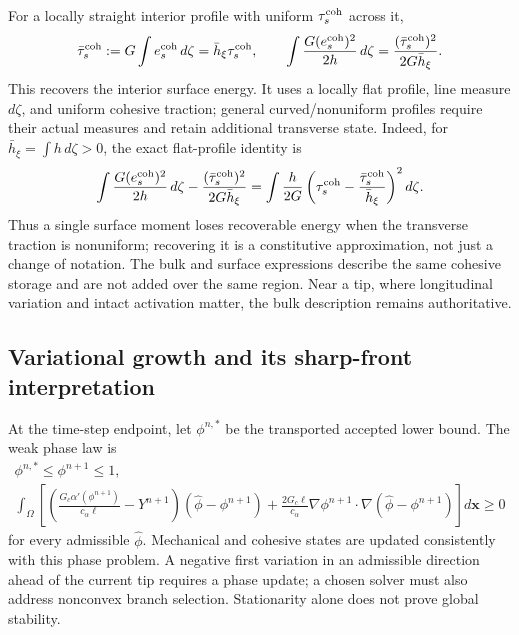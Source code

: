 \documentclass[10pt,a4paper]{article}
\begin{document}
For a locally straight interior profile with uniform
$\tau_s^{\rm coh}$ across it,
\begin{equation}
 \bar\tau_s^{\rm coh}:=G\int e_s^{\rm coh}\,d\zeta
       =\bar h_\xi\tau_s^{\rm coh},
 \qquad
 \int\frac{G(e_s^{\rm coh})^2}{2h}\,d\zeta
       =\frac{(\bar\tau_s^{\rm coh})^2}{2G\bar h_\xi}.
 \label{eq:tip_surface_reduction}
\end{equation}
This recovers the interior surface energy. It uses a locally flat profile,
line measure $d\zeta$, and uniform cohesive traction; general curved/nonuniform
profiles require their actual measures and retain additional transverse state.
Indeed, for $\bar h_\xi=\int h\,d\zeta>0$, the exact flat-profile identity is
\begin{equation}
 \int\frac{G(e_s^{\rm coh})^2}{2h}\,d\zeta
 -\frac{(\bar\tau_s^{\rm coh})^2}{2G\bar h_\xi}
 =\int\frac{h}{2G}
 \left(\tau_s^{\rm coh}-\frac{\bar\tau_s^{\rm coh}}{\bar h_\xi}\right)^2d\zeta.
 \label{eq:tip_transverse_variance}
\end{equation}
Thus a single surface moment loses recoverable energy when the transverse
traction is nonuniform; recovering it is a constitutive approximation, not
just a change of notation.
The bulk and surface expressions describe the same cohesive storage and are
not added over the same region. Near a tip, where longitudinal variation and
intact activation matter, the bulk description remains authoritative.

\subsection{Variational growth and its sharp-front interpretation}

At the time-step endpoint, let $\phi^{n,*}$ be the transported accepted lower bound.
The weak phase law is
\begin{equation}
 \begin{gathered}
 \phi^{n,*}\leq\phi^{n+1}\leq1,\\
 \int_\Omega\left[
 \left(\frac{G_c\alpha'(\phi^{n+1})}{c_\alpha\ell}-Y^{n+1}\right)
                  (\widehat\phi-\phi^{n+1})
 +\frac{2G_c\ell}{c_\alpha}\nabla\phi^{n+1}\cdot
                    \nabla(\widehat\phi-\phi^{n+1})\right]d\bm x\geq0
 \end{gathered}
 \label{eq:tip_vi}
\end{equation}
for every admissible $\widehat\phi$. Mechanical and cohesive states are
updated consistently with this phase problem. A negative first variation in
an admissible direction ahead of the current tip requires a phase update;
a chosen solver must also address nonconvex branch selection. Stationarity
alone does not prove global stability.
\end{document}
